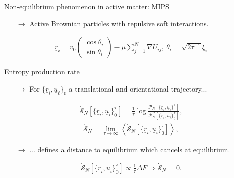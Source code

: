 \documentclass{beamer}
\begin{document}
\begin{frame}{Non-equilibrium phenomenon in active matter: MIPS}

\begin{itemize}
  \item[$\rightarrow$] Active Brownian particles with repulsive soft interactions.
\end{itemize}
\vspace{-5pt}
\begin{align*}
\dot{\underline{r}}_i = v_0 \begin{pmatrix} \cos \theta_i \\ \sin \theta_i \end{pmatrix} - \mu \sum_{j=1}^N \nabla U_{ij},~ \dot{\theta}_i = \sqrt{2 \tau^{-1}}\xi_i
\end{align*}

\vspace{-10pt}


\end{frame}

\begin{frame}{Entropy production rate}

\begin{itemize}
  \item[$\rightarrow$] For $\{\underline{r}_i, \underline{u}_i\}_0^{\tau}$ a translational and orientational trajectory...
\end{itemize}

\begin{align*}
\dot{\mathcal{S}}_N\left[\{\underline{r}_i, \underline{u}_i\}_0^{\tau}\right] = \frac{1}{\tau} \log\frac{\mathcal{P}_N\left[\{\underline{r}_i, \underline{u}_i\}_0^{\tau}\right]}{\mathcal{P}_N^R\left[\{\underline{r}_i, \underline{u}_i\}_0^{\tau}\right]},
\end{align*}
\begin{align*}
\dot{\mathcal{S}}_N = \lim_{\tau \rightarrow \infty} \left<\dot{\mathcal{S}}_N\left[\{\underline{r}_i, \underline{u}_i\}_0^{\tau}\right]\right>,
\end{align*}

\return
\begin{itemize}
  \item[$\rightarrow$] ... defines a distance to equilibrium which cancels at equilibrium.
\end{itemize}
\begin{align*}
\dot{\mathcal{S}}_N\left[\{\underline{r}_i, \underline{u}_i\}_0^{\tau}\right] \propto \frac{1}{\tau} \Delta F \Rightarrow \dot{\mathcal{S}}_N = 0.
\end{align*}


\end{frame}
\end{document}
